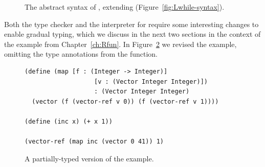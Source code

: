\documentclass[7x10]{TimesAPriori_MIT}%
\newcommand{\gray}[1]{{\color{gray} #1}}
\begin{document}
\begin{figure}[tp]
\centering
\fbox{
  \begin{minipage}{0.96\textwidth}
    \small
\[
\begin{array}{lcl}
  \itm{param} &::=& \Var \MID \LS\Var \key{:} \Type\RS \\
  \Exp &::=& \gray{ \INT{\Int} \VAR{\Var} \MID \LET{\Var}{\Exp}{\Exp} } \\
       &\MID& \gray{ \PRIM{\itm{op}}{\Exp\ldots} }\\
     &\MID& \gray{ \BOOL{\itm{bool}}
      \MID \IF{\Exp}{\Exp}{\Exp} } \\
     &\MID& \gray{ \VOID{} \MID \LP\key{HasType}~\Exp~\Type \RP 
     \MID \APPLY{\Exp}{\Exp\ldots} }\\
  &\MID& \LAMBDA{\LP\itm{param}\ldots\RP}{\Type}{\Exp} \\
  &\MID& \gray{ \SETBANG{\Var}{\Exp} \MID \BEGIN{\LP\Exp\ldots\RP}{\Exp} } \\
  &\MID& \gray{ \WHILE{\Exp}{\Exp} } \\
 \Def &::=& \FUNDEF{\Var}{\LP\itm{param}\ldots\RP}{\Type}{\code{'()}}{\Exp} \\
  \LangGradM{} &::=& \gray{ \PROGRAMDEFSEXP{\code{'()}}{\LP\Def\ldots\RP}{\Exp} }
\end{array}
\]
\end{minipage}
}
\caption{The abstract syntax of \LangGrad{}, extending \LangLoop{} (Figure~\ref{fig:Lwhile-syntax}).}
\label{fig:Rgrad-syntax}
\end{figure}



Both the type checker and the interpreter for \LangGrad{} require some
interesting changes to enable gradual typing, which we discuss in the
next two sections in the context of the  example from
Chapter~\ref{ch:Rfun}.  In Figure~\ref{fig:gradual-map} we
revised the  example, omitting the type annotations from
the  function.

\begin{figure}[btp]
\begin{lstlisting}
(define (map [f : (Integer -> Integer)]
                   [v : (Vector Integer Integer)])
                   : (Vector Integer Integer)
  (vector (f (vector-ref v 0)) (f (vector-ref v 1))))

(define (inc x) (+ x 1))

(vector-ref (map inc (vector 0 41)) 1)
\end{lstlisting}
\caption{A partially-typed version of the  example.}
\label{fig:gradual-map}
\end{figure}
\end{document}
